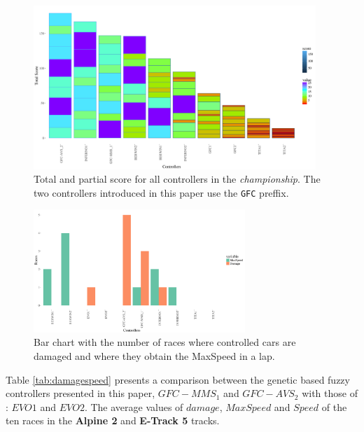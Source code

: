 \documentclass[conference]{IEEEtran}
\begin{document}
\begin{figure}[h!tb]	
  \begin{center}
    \includegraphics[width=0.95\textwidth]{fig/POINTS.png}
    \caption{Total and partial score for all controllers in the {\em
        championship}. The two controllers introduced in
    this paper use the {\tt GFC} preffix.}
    \label{fig:points}	
  \end{center}	
\end{figure}
%
\begin{figure}[!ht]	
	\begin{center}
          \includegraphics[width=8cm]{fig/HISTSD.png}
		\caption{Bar chart with the number of races where controlled
                  cars are damaged and where they obtain the MaxSpeed
                in a lap.}
		\label{fig:damspeed}	
	\end{center}	
\end{figure}

Table \ref{tab:damagespeed} presents a comparison between the genetic based fuzzy controllers presented in this paper, \textbf{$GFC-MMS_1$} and \textbf{$GFC-AVS_2$} with  
those of  \cite{evo18}: $EVO1$  and $EVO2$. The average values of $damage$, $MaxSpeed$ and $Speed$ of the ten races in the \textbf{Alpine 2} and  \textbf{E-Track 5} tracks.
\end{document}
